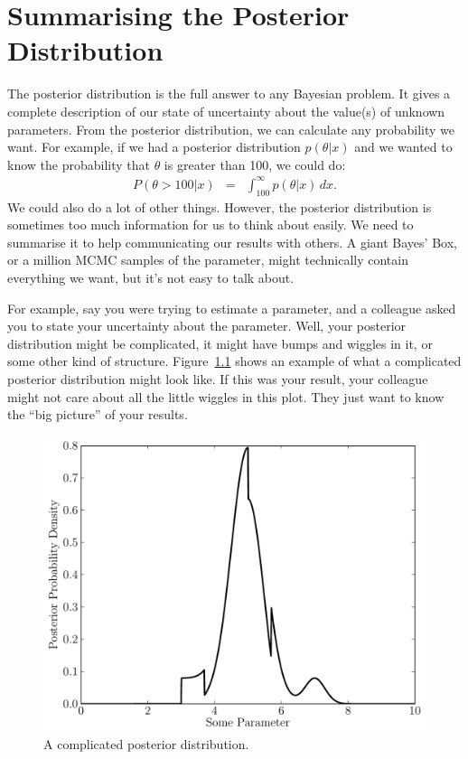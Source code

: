 \chapter{Summarising the Posterior Distribution}
The posterior distribution is the full answer to any Bayesian problem. It gives
a complete description of our state of uncertainty about the value(s) of unknown
parameters. From the posterior distribution, we can calculate any probability
we want. For example, if we had a posterior distribution $p(\theta|x)$ and we
wanted to know the probability that $\theta$ is greater than 100, we could do:
\begin{eqnarray}
P(\theta > 100 | x) &=& \int_100^\infty p(\theta | x) \, dx.
\end{eqnarray}
We could also do a lot of other things.
However, the posterior distribution is sometimes too much
information for us to think about easily. We need to summarise it to help
communicating our results with others. A giant Bayes' Box, or a million MCMC
samples of the parameter, might technically
contain everything we want, but it's not easy to talk about.

For example, say you were trying to estimate
a parameter, and a colleague asked you to state your uncertainty about the
parameter. Well, your posterior distribution might be complicated, it might
have bumps and wiggles in it, or some other kind of structure.
Figure~\ref{fig:complicated_posterior} shows an example of what a complicated
posterior distribution might look like. If this was your result, your colleague
might not care about all the little wiggles in this plot. They just want to know
the ``big picture'' of your results.
\begin{figure}[h!]
\begin{center}
\includegraphics[scale=0.6]{Figures/complicated_posterior.pdf}
\caption{A complicated posterior distribution.\label{fig:complicated_posterior}}
\end{center}
\end{figure}

